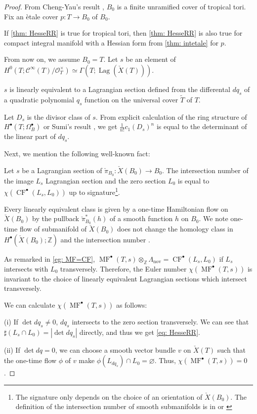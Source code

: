 \documentclass[a4paper,dvipdfmx,reqno,12pt]{amsart}
\theoremstyle{definition}
\newcommand{\emp}{\varnothing}%
\newcommand{\Z}{\mathbb{Z}}%
\newcommand{\mcal}[1]{\mathcal{#1}}%
\newcommand{\opn}[1]{\operatorname{#1}}
\numberwithin{equation}{section}
\begin{document}
\begin{proof}

From Cheng-Yau's result \cite{MR714338}, $B_0$ is a finite unramified cover of tropical tori.
Fix an \`etale cover $p:T \to B_0$ of $B_0$.

If \cref{thm: HesseRR} is true for tropical tori,
then \cref{thm: HesseRR} is also true for compact
integral manifold with a Hessian form from
\cref{thm: intetale} for $p$.

From now on, we assume $B_0=T$.
Let $s$ be an element of 
$H^{0}(T;\mcal{C}^{\infty}(T)/\mcal{O}_{T}^{\times})\simeq
\Gamma(T;\opn{Lag}(\check{X}(T)))$.

$s$ is linearly equivalent to a Lagrangian section
defined from the differental $dq_s$ of a quadratic polynomial
$q_s$ function on the universal cover $\tilde{T}$ of $T$.

Let $D_s$ is the divisor class of $s$.
From explicit calculation of the ring structure of
$H^{\bullet}(T;\Omega_B^{\bullet})$ or Sumi's result
\cite[Theorem 47]{MR4229604}, we get 
$\frac{1}{n!}c_1(D_s)^{n}$ is equal to the determinant
of the linear part of $dq_s$.

Next, we mention the following well-known fact:

Let $s$ be a Lagrangian section of 
$\check{\pi}_{B_0}\colon \check{X}(B_0) \to B_0$.
The intersection number of the image $L_s$ Lagrangian
section and the zero section $L_0$ is equal to
$\chi(\opn{CF}^{\bullet}(L_s,L_0))$ up to 
signature\footnote{The signature only depends on
the choice of 
an orientation of $\check{X}(B_0)$. 
The definition of the intersection number of smooth 
submanifolds is in \cite[5.2]{MR1336822} or 
\cite[0.4]{griffithsPrinciplesAlgebraicGeometry1994a}}. 

Every linearly equivalent 
class is given by a one-time Hamiltonian flow on 
$\check{X}(B_0)$ by the pullback $\check{\pi}_{B_0}^{*}(h)$
of a smooth function $h$ on $B_0$.
We note one-time flow of submanifold of $\check{X}(B_0)$ does not change
the homology class in $H^{\bullet}(\check{X}(B_0);\Z)$ and
the intersection number \cite[5.2.1. Theorem]{MR1336822}.

As remarked in \cref{eg: MF=CF}, 
$\opn{MF}^{\bullet}(T,s)\otimes_{\Z}\Lambda_{\opn{nov}}
=\opn{CF}^{\bullet}(L_s,L_0)$ if $L_s$ intersects with
$L_0$ transversely. Therefore, 
the Euler number $\chi(\opn{MF}^{\bullet}(T,s))$ is 
invariant to the choice of linearly equivalent 
Lagrangian sections which intersect transversely.

We can calculate $\chi(\opn{MF}^{\bullet}(T,s))$ as follows:

(i) If $\det dq_s\ne 0$, $dq_s$ intersects to 
the zero section transversely. We can see that 
$\sharp(L_s\cap L_0)=|\det dq_s|$ directly, and thus
we get \cref{eq: HesseRR}. 

(ii) If $\det dq=0$, we can choose a smooth vector bundle $v$ on 
$\check{X}(T)$ such that the one-time flow $\phi$ of $v$ make 
$\phi(L_{dq_s})\cap L_0=\emp$. 
Thus, $\chi(\opn{MF}^{\bullet}(T,s))=0$.



\end{proof}
\end{document}
